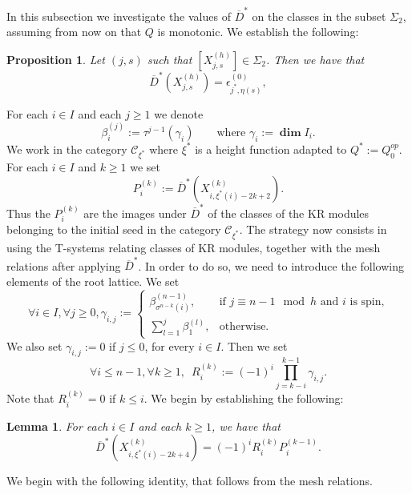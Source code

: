 \documentclass[12pt]{amsart}
\theoremstyle{plain}
\newtheorem{proposition}[theorem]{Proposition}
\newtheorem{lemma}[theorem]{Lemma}
\theoremstyle{definition}
\numberwithin{equation}{section}
\newcommand{\barDstar}{\overline{D}^{*}}
\newcommand{\xistar}{\xi^{*}}
\begin{document}
  In this subsection we investigate the values of $\barDstar$ on the classes in the subset $\Sigma_2$, assuming from now on that $Q$ is monotonic. We establish the following:

 \begin{proposition} \label{prop : Dbarstar of KRs in Sigma2}
     Let $(j,s)$ such that $[X_{j,s}^{(h)}] \in \Sigma_2$. Then we have that 
     $$ \barDstar \left( X_{j,s}^{(h)} \right) = \epsilon_{j^{*},\eta(s)}^{(0)}, %
     $$
 \end{proposition}
  
For each $i \in I$ and each $j \ge 1$ we denote
 $$ \beta_i^{(j)} := \tau^{j-1}(\gamma_i)  \qquad \text{where $\gamma_i := \boldsymbol{\dim} I_i$.} $$
 We work in the category $\mathcal{C}_{\xi^{*}}$ where $\xi^{*}$ is a height function adapted to $Q^{*} := Q_0^{op}$. For each $i \in I$ and $k \geq 1$ we set 
 $$ P_i^{(k)} := \overline{D}^{*} \left(  X_{i, \xi^{*}(i)-2k+2}^{(k)} \right) . 
 $$
 Thus the $P_i^{(k)}$ are the images under $\barDstar$ of the classes of the KR modules belonging to the initial seed in the category $\mathcal{C}_{\xistar}$. The strategy now consists in using the T-systems relating classes of KR modules, together with the mesh relations after applying $\barDstar$. In order to do so, we need to  introduce the following elements of the root lattice.  We set
$$
\forall i \in I , \forall j \geq 0, \gamma_{i,j} := 
\begin{cases}
    \beta_{\sigma^{n-k}(i)}^{(n-1)}, & \text{if $j \equiv n-1 \mod h$ and $i$ is spin,} \\
    \sum_{l=1}^j \beta_1^{(l)}, & \text{otherwise.}
\end{cases}
$$
We also set $\gamma_{i,j} := 0$ if $j \leq 0$, for every $i \in I$. 
 Then we set 
 $$ \forall i \leq n-1, \forall k \geq 1, \enspace R_i^{(k)} :=  (-1)^{i} \prod_{j=k-i}^{k-1} \gamma_{i,j} . $$
 Note that $R_i^{(k)} = 0$ if $k \leq i$.
 We begin by establishing the following:

  \begin{lemma} \label{lem : formula for KR modules in Kxistar}
  For each $i \in I$ and each $k \geq 1$, we have that 
 $$\overline{D}^{*} \left(  X_{i, \xi^{*}(i)-2k+4}^{(k)} \right) = (-1)^{i} R_i^{(k)} P_i^{(k-1)} . $$
  \end{lemma}


We begin with the following identity, that follows from the mesh relations. 
\end{document}
